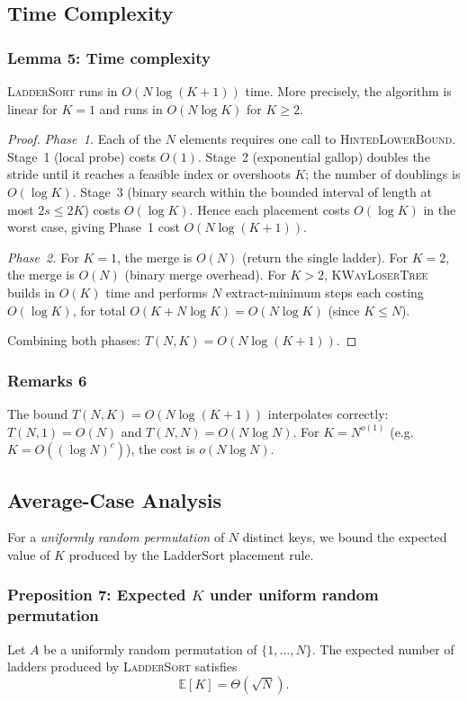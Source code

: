 \documentclass[12pt,a4paper]{article}
\theoremstyle{plain}
\theoremstyle{definition}
\begin{document}
\subsection{Time Complexity}
\label{sec:timecomplexity}

\subsubsection{Lemma 5: Time complexity}

\textsc{LadderSort} runs in $O(N\log(K+1))$ time. More precisely, the algorithm is linear for $K=1$ and runs in $O(N\log K)$ for $K \ge 2$.


\begin{proof}
\emph{Phase~1.}  Each of the $N$ elements requires one call to
\textsc{HintedLowerBound}.  Stage~1 (local probe) costs $O(1)$.
Stage~2 (exponential gallop) doubles the stride until it reaches a
feasible index or overshoots $K$; the number of doublings is
$O(\log K)$.  Stage~3 (binary search within the bounded interval of
length at most $2s \le 2K$) costs $O(\log K)$.  Hence each placement
costs $O(\log K)$ in the worst case, giving Phase~1 cost $O(N \log(K+1))$.

\emph{Phase~2.}  For $K = 1$, the merge is $O(N)$ (return the single ladder).
For $K = 2$, the merge is $O(N)$ (binary merge overhead).  For $K > 2$, \textsc{KWayLoserTree} builds in $O(K)$ time
and performs $N$ extract-minimum steps each costing $O(\log K)$, for
total $O(K + N\log K) = O(N\log K)$ (since $K \le N$).

Combining both phases: $T(N, K) = O(N\log(K+1))$.
\end{proof}

\subsubsection{Remarks 6}
The bound $T(N,K)=O(N\log(K+1))$ interpolates correctly: $T(N,1)=O(N)$ and $T(N,N)=O(N\log N)$.  For $K = N^{o(1)}$ (e.g.\ $K = O((\log N)^c)$),
the cost is $o(N \log N)$.


\subsection{Average-Case Analysis}
\label{sec:avgcase}

For a \emph{uniformly random permutation} of $N$ distinct keys, we bound the
expected value of $K$ produced by the LadderSort placement rule.

\subsubsection{Preposition 7: Expected $K$ under uniform random permutation}
\label{prop:avgcase}
Let $A$ be a uniformly random permutation of $\{1, \dots, N\}$.  The
expected number of ladders produced by \textsc{LadderSort} satisfies
\[
  \mathbb{E}[K] = \Theta(\sqrt{N}).
\]
\end{document}
